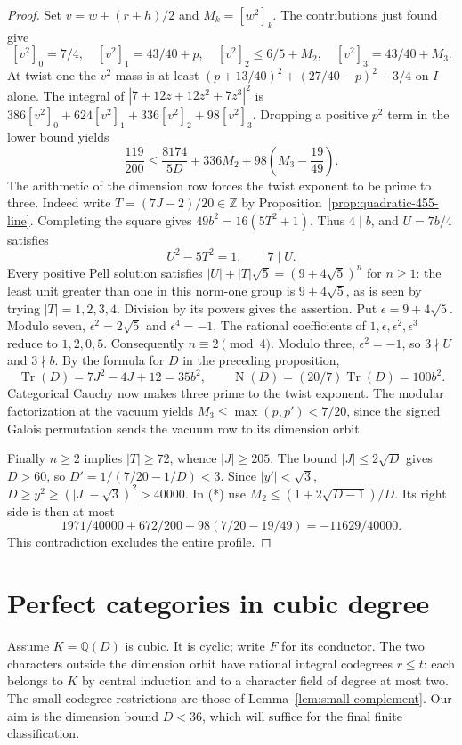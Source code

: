 \documentclass[11pt,a4paper]{article}
\numberwithin{equation}{section}
\begin{document}
\begin{proof}
Set $v=w+(r+h)/2$ and $M_k=[w^2]_k$. The contributions just found
give
\[
 [v^2]_0=7/4,\quad [v^2]_1=43/40+p,\quad
 [v^2]_2\le6/5+M_2,\quad [v^2]_3=43/40+M_3.
\]
At twist one the $v^2$ mass is at least
$(p+13/40)^2+(27/40-p)^2+3/4$ on $I$ alone.
The integral of $|7+12z+12z^2+7z^3|^2$ is
$386[v^2]_0+624[v^2]_1+336[v^2]_2+98[v^2]_3$.
Dropping a positive $p^2$ term in the lower bound yields
\[
 \frac{119}{200}\le \frac{8174}{5D}+336M_2+
                  98\left(M_3-\frac{19}{49}\right).
 \tag{*}
\]
The arithmetic of the dimension row forces the twist exponent to be
prime to three. Indeed write $T=(7J-2)/20\in\mathbb Z$ by
Proposition~\ref{prop:quadratic-455-line}. Completing the square gives
$49b^2=16(5T^2+1)$. Thus $4\mid b$, and $U=7b/4$ satisfies
\[
 U^2-5T^2=1,\qquad 7\mid U.
\]
Every positive Pell solution satisfies
$|U|+|T|\sqrt5=(9+4\sqrt5)^n$ for $n\ge1$:
the least unit greater than one in this norm-one group is
$9+4\sqrt5$, as is seen by trying $|T|=1,2,3,4$.
Division by its powers gives the assertion.
Put $\epsilon=9+4\sqrt5$. Modulo seven, $\epsilon^2=2\sqrt5$
and $\epsilon^4=-1$. The rational coefficients of
$1,\epsilon,\epsilon^2,\epsilon^3$ reduce to $1,2,0,5$.
Consequently $n\equiv2\pmod4$. Modulo three, $\epsilon^2=-1$, so
$3\nmid U$ and $3\nmid b$. By the formula for $D$ in the preceding
proposition,
\[
 \operatorname{Tr}(D)=7J^2-4J+12=35b^2,\qquad
 \operatorname{N}(D)=(20/7)\operatorname{Tr}(D)=100b^2 .
\]
Categorical Cauchy now makes three prime to the twist exponent.
The modular factorization at the vacuum yields
$M_3\le\max(p,p')<7/20$, since the signed Galois permutation sends
the vacuum row to its dimension orbit.

Finally $n\ge2$ implies $|T|\ge72$, whence $|J|\ge205$.
The bound $|J|\le2\sqrt D$ gives $D>60$, so
$D'=1/(7/20-1/D)<3$. Since $|y'|<\sqrt3$,
$D\ge y^2\ge(|J|-\sqrt3)^2>40000$. In (*) use
$M_2\le(1+2\sqrt{D-1})/D$. Its right side is then at most
\[
 1971/40000+672/200+98(7/20-19/49)
 = -11629/40000 .
\]
This contradiction excludes the entire profile.
\end{proof}




\section{Perfect categories in cubic degree}
\label{sec:perfect-cubic}
Assume $K=\mathbb Q(D)$ is cubic. It is cyclic; write $F$ for its
conductor. The two characters outside the dimension orbit have
rational integral codegrees $r\le t$: each belongs to $K$ by central
induction and to a character field of degree at most two.
The small-codegree restrictions are those of
Lemma~\ref{lem:small-complement}. Our aim is the dimension bound
$D<36$, which will suffice for the final finite classification.
\end{document}
